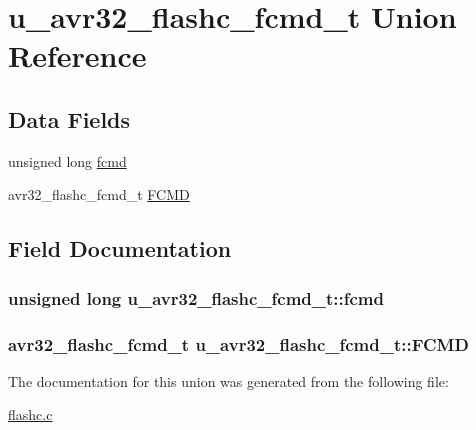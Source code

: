 \hypertarget{unionu__avr32__flashc__fcmd__t}{
\section{u\-\_\-avr32\-\_\-flashc\-\_\-fcmd\-\_\-t \-Union \-Reference}
\label{unionu__avr32__flashc__fcmd__t}
}
\subsection*{\-Data \-Fields}
\begin{DoxyCompactItemize}
\item 
unsigned long \hyperlink{unionu__avr32__flashc__fcmd__t_a6e34d6a9df4c1f26204d439fd5314700}{fcmd}
\item 
avr32\-\_\-flashc\-\_\-fcmd\-\_\-t \hyperlink{unionu__avr32__flashc__fcmd__t_a417db73c116267ff3545f9af41fac150}{\-F\-C\-M\-D}
\end{DoxyCompactItemize}


\subsection{\-Field \-Documentation}
\hypertarget{unionu__avr32__flashc__fcmd__t_a6e34d6a9df4c1f26204d439fd5314700}{
\subsubsection[{fcmd}]{\setlength{\rightskip}{0pt plus 5cm}unsigned long {\bf u\-\_\-avr32\-\_\-flashc\-\_\-fcmd\-\_\-t\-::fcmd}}}
\label{unionu__avr32__flashc__fcmd__t_a6e34d6a9df4c1f26204d439fd5314700}
\hypertarget{unionu__avr32__flashc__fcmd__t_a417db73c116267ff3545f9af41fac150}{
\subsubsection[{\-F\-C\-M\-D}]{\setlength{\rightskip}{0pt plus 5cm}avr32\-\_\-flashc\-\_\-fcmd\-\_\-t {\bf u\-\_\-avr32\-\_\-flashc\-\_\-fcmd\-\_\-t\-::\-F\-C\-M\-D}}}
\label{unionu__avr32__flashc__fcmd__t_a417db73c116267ff3545f9af41fac150}


\-The documentation for this union was generated from the following file\-:\begin{DoxyCompactItemize}
\item 
\hyperlink{flashc_8c}{flashc.\-c}\end{DoxyCompactItemize}
